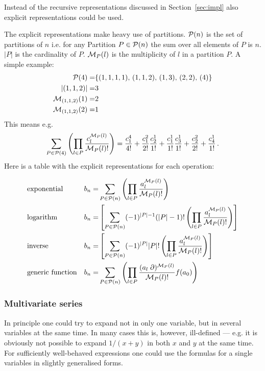 \documentclass{article}
\begin{document}
Instead of the recursive representations discussed in
Section~\ref{sec:impl} also explicit representations could be used.

The explicit representations make heavy use of partitions.
${\cal P}(n)$ is the set of partitions of $n$ i.e. for any
Partition $P \in {\cal P}(n)$ the sum over all elements of $P$ is
$n$. $|P|$ is the cardinality of $P$.
${\cal M}_P(l)$ is the multiplicity of $l$ in a partition $P$. A simple
example:
\begin{align*}
  {\cal P}(4)=&\{(1,1,1,1),\,(1,1,2),\,(1,3),\,(2,2),\,(4)\}\\
  |(1,1,2)|=&3\\
  {\cal M}_{(1,1,2)}(1)=&2\\
  {\cal M}_{(1,1,2)}(2)=&1\\
\end{align*}
This means e.g. 
\begin{equation}
  \label{eq:exp_ex}
\sum_{P \in {\cal P}(4)} \left(\prod_{l \in P} \frac{c^{{\cal M}_P(l)}_l}{{\cal M}_P(l)!} \right)=
  \frac{c_1^4}{4!}+\frac{c_1^2}{2!}\frac{c_2^1}{1!}+\frac{c_1^1}{1!}\frac{c_3^1}{1!}+\frac{c_2^2}{2!}+\frac{c_4^1}{1!}\,.
\end{equation}
Here is a table with the explicit representations for each operation:


\begin{align}
  &\text{exponential} & b_n=& \sum_{P \in {\cal P}(n)} \left(\prod_{l \in P}
    \frac{a^{{\cal M}_P(l)}_l}{{\cal M}_P(l)!} \right)
  \notag\\
  &\text{logarithm} & b_n=&\left[\sum_{P \in {\cal P}(n)}
    (-1)^{|P|-1}(|P|-1)!\left(\prod_{l \in P} \frac{a^{{\cal
            M}_P(l)}_l}{{\cal M}_P(l)!} \right)\right]
  \notag\\
  &\text{inverse} & b_n=&\left[\sum_{P \in {\cal P}(n)}
    (-1)^{|P|}|P|!\left(\prod_{l \in P} \frac{a^{{\cal M}_P(l)}_l}{{\cal
          M}_P(l)!} \right)\right]
  \notag\\
  &\text{generic function}& b_n=& \sum_{P \in {\cal P}(n)} \left(\prod_{l \in P}
    \frac{(a_l \;\partial)^{{\cal M}_P(l)}}{{\cal M}_P(l)!}
    f(a_0)\right)
\label{eq:expl}
\end{align}

\subsubsection{Multivariate series}
\label{sec:multi_var}

In principle one could try to expand not in only one variable, but in
several variables at the same time. In many cases this is, however,
ill-defined --- e.g. it is obviously not possible to expand $1/(x+y)$ in
both $x$ and $y$ at the same time. For sufficiently well-behaved
expressions one could use the formulas for a single variables in slightly
generalised forms. 
\end{document}
